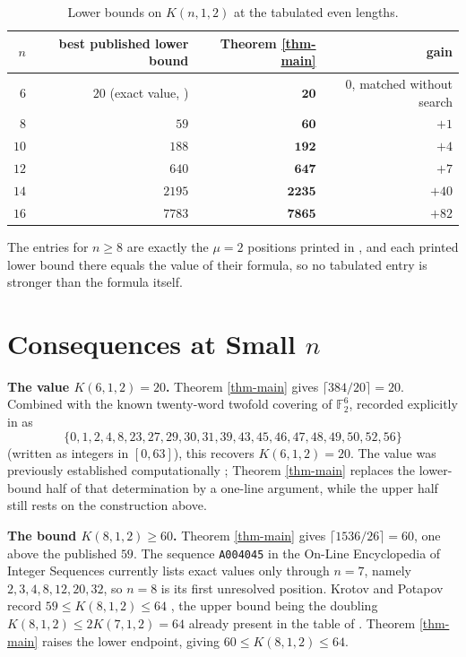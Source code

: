 \documentclass[10pt,a4paper]{article}
\begin{document}
\begin{table}[h]
\centering
\begin{tabular}{r|r|r|r}
$n$ & best published lower bound & Theorem \ref{thm-main} & gain \\ \hline
$6$  & $20$ (exact value, \cite{Seuranen-2007}) & $\mathbf{20}$ & $0$, matched without search \\
$8$  & $59$ \cite{KP-2021} & $\mathbf{60}$ & $+1$ \\
$10$ & $188$ \cite{Seuranen-2007,KP-2021} & $\mathbf{192}$ & $+4$ \\
$12$ & $640$ \cite{KP-2021} & $\mathbf{647}$ & $+7$ \\
$14$ & $2195$ \cite{KP-2021} & $\mathbf{2235}$ & $+40$ \\
$16$ & $7783$ \cite{KP-2021} & $\mathbf{7865}$ & $+82$
\end{tabular}
\caption{Lower bounds on $K(n,1,2)$ at the tabulated even lengths.}
\label{tab-1}
\end{table}

The entries for $n\ge 8$ are exactly the $\mu=2$ positions printed in
\cite{KP-2021}, and each printed lower bound there equals the value of their
formula, so no tabulated entry is stronger than the formula itself.

\section{Consequences at Small $n$}\label{sec-small}

\textbf{The value $K(6,1,2)=20$.} Theorem \ref{thm-main} gives
$\lceil 384/20\rceil=20$. Combined with the known twenty-word twofold covering
of $\mathbb{F}_2^6$, recorded explicitly in \cite{OEIS-A004045} as
\[
  \{0,1,2,4,8,23,27,29,30,31,39,43,45,46,47,48,49,50,52,56\}
\]
(written as integers in $[0,63]$), this recovers $K(6,1,2)=20$. The value was
previously established computationally \cite{Seuranen-2007}; Theorem
\ref{thm-main} replaces the lower-bound half of that determination by a
one-line argument, while the upper half still rests on the construction above.

\textbf{The bound $K(8,1,2)\ge 60$.} Theorem \ref{thm-main} gives
$\lceil 1536/26\rceil = 60$, one above the published $59$. The sequence
\texttt{A004045} in the On-Line Encyclopedia of Integer Sequences
\cite{OEIS-A004045} currently lists exact values only through $n=7$, namely
$2,3,4,8,12,20,32$, so $n=8$ is its first unresolved position. Krotov and
Potapov record $59\le K(8,1,2)\le 64$ \cite{KP-2021}, the upper bound being the
doubling $K(8,1,2)\le 2K(7,1,2)=64$ already present in the table of
\cite{HHKL-1993}. Theorem \ref{thm-main} raises the lower endpoint, giving
$60\le K(8,1,2)\le 64$.
\end{document}
